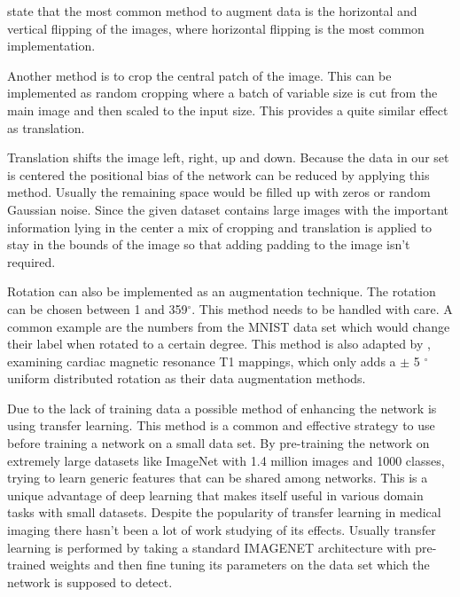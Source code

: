 \documentclass[
a4paper, 
12pt,
grayscalebody, %
abstract=on,
twoside, BCOR10mm, 12pt, DIV13,headinclude, footexclude, final, abstracton, openright
]{ibireprt}
\numberwithin{equation}{chapter}
\numberwithin{table}{chapter}
\numberwithin{figure}{chapter}
\numberwithin{algorithm}{chapter}
\numberwithin{example}{chapter}
\numberwithin{example}{chapter}
\begin{document}
\cite{Shorten2019} state that the most common method to augment data is the horizontal and vertical flipping of the images, where horizontal flipping is the most common implementation.

Another method is to crop the central patch of the image. This can be implemented as random cropping where a batch of variable size is cut from the main image and then scaled to the input size. This provides a quite similar effect as translation. 

Translation shifts the image left, right, up and down. Because the data in our set is centered the positional bias of the network can be reduced by applying this method. Usually the remaining space would be filled up with zeros or random Gaussian noise. Since the given dataset contains large images with the important information lying in the center a mix of cropping and translation is applied to stay in the bounds of the image so that adding padding to the image isn't required. 

Rotation can also be implemented as an augmentation technique. The rotation can be chosen between 1 and 359$^\circ$. This method needs to be handled with care. A common example are the numbers from the MNIST data set which would change their label when rotated to a certain degree. This method is also adapted by \cite{Zhang2020}, examining cardiac magnetic resonance T1 mappings, which only adds a $\pm$ 5 $^\circ$ uniform distributed rotation as their data augmentation methods. 



Due to the lack of training data a possible method of enhancing the network is using transfer learning. This method is a common and effective strategy to use before training a network on a small data set. By pre-training the network on extremely large datasets like ImageNet with 1.4 million images and 1000 classes, trying to learn generic features that can be shared among networks. \cite{Yamashita2018} This is a unique advantage of deep learning that makes itself useful in various domain tasks with small datasets. Despite the popularity of transfer learning in medical imaging there hasn't been a lot of work studying of its effects. Usually transfer learning is performed by taking a standard IMAGENET architecture with pre-trained weights and then fine tuning its parameters on the data set which the network is supposed to detect.
\end{document}
